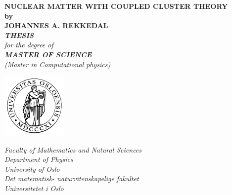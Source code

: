 \thispagestyle{empty}
\begin{center}        %
  \vspace{5mm}          %
  \LARGE
  \textbf{NUCLEAR MATTER WITH COUPLED CLUSTER THEORY} \\
  \Large
  \vspace{5mm}
  \textbf{by} \\
  \vspace{5mm}
  \large
  \textbf{JOHANNES A. REKKEDAL} \\
  \vspace{20mm} 
  \Large
  {\bf{\textsl{THESIS}}} \\
  \textsl{for the degree of} \\
  \vspace{2mm}
  {\bf{\textsl{MASTER OF SCIENCE}}} \\
  \vspace{5mm}
  {\large \textsl {(Master in Computational physics)}}\\
  \vspace{10mm}
  \centerline{
\includegraphics[width=32mm,height=32mm]{uiologo}}
  \vspace{5mm}
  \index{\footnote{}}%
  \textsl{Faculty of Mathematics and Natural Sciences} \\
  \textsl{Department of Physics} \\
  \textsl{University of Oslo} \\
  \vspace{10mm}
  \large
  \vspace{5mm}
  \normalsize
  \textsl{Det matematisk- naturvitenskapelige fakultet} \\
  \textsl{Universitetet i Oslo} \\
\end{center}
\thispagestyle{empty}
